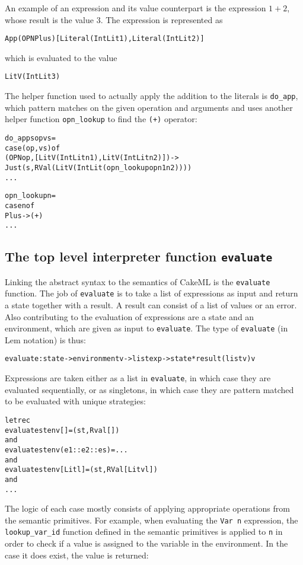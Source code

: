 An example of an expression and its value counterpart is the expression $1 + 2$,
whose result is the value 3. The expression is represented as
\begin{alltt}
  App (OPN Plus) [Literal (IntLit 1), Literal (IntLit 2)]
\end{alltt}
which is evaluated to the value
\begin{alltt}
  LitV (IntLit 3)
\end{alltt}
The helper function used to actually apply the addition to the literals
is \texttt{do\_app},
which pattern matches on the given operation and arguments and
uses another helper function \texttt{opn\_lookup} to find the \texttt{(+)}
operator:
\begin{alltt}
  do_app s op vs =
    case (op, vs) of
      (OPN op, [LitV (IntLit n1), LitV (IntLit n2)]) ->
        Just (s, RVal (LitV (IntLit (opn_lookup op n1 n2))))
  ...

  opn_lookup n =
    case n of
      Plus   -> (+)
  ...
\end{alltt}


\subsection{The top level interpreter function \texttt{evaluate}}
Linking the abstract syntax to the semantics of CakeML is the
\texttt{evaluate} function. The job of \texttt{evaluate} is to take a list of
expressions as input and return a state together with a result. A result can
consist of a list of values or an error. Also contributing to the evaluation
of expressions are a state and an environment, which are given as input to
\texttt{evaluate}. The type of \texttt{evaluate} (in Lem notation) is thus:

\begin{alltt}
  evaluate:state -> environment v -> list exp -> state*result (list v) v
\end{alltt}

\noindent Expressions are taken either as a list in \texttt{evaluate},
in which case they are evaluated sequentially, or as singletons, in which case
they are pattern matched to be evaluated with unique strategies:
\newpage
\begin{alltt}
  let rec
  evaluate st env []           = (st, Rval [])
  and
  evaluate st env (e1::e2::es) = ...
  and
  evaluate st env [Lit l]      = (st, RVal [Litv l])
  and
  ...
\end{alltt}

\noindent The logic of each case mostly consists of applying appropriate
operations from the semantic primitives. For example, when evaluating
the \texttt{Var n} expression, the \texttt{lookup\_var\_id} function defined
in the semantic primitives is applied to \texttt{n} in order to check if
a value is assigned to the variable in the environment. In the case it does
exist, the value is returned:

